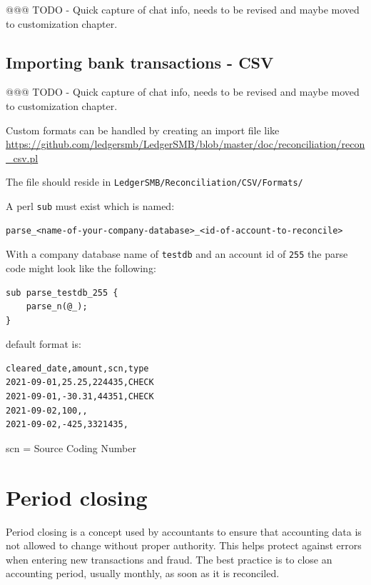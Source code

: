 @@@ TODO - Quick capture of chat info, needs to be revised and maybe moved to customization chapter.

\subsection{Importing bank transactions - CSV}
\label{subsec-importing-bank-transactions-csv}


@@@ TODO - Quick capture of chat info, needs to be revised and maybe moved to customization chapter.

Custom formats can be handled by creating an import file
like \url{https://github.com/ledgersmb/LedgerSMB/blob/master/doc/reconciliation/recon_csv.pl}

The file should reside in \texttt{LedgerSMB/Reconciliation/CSV/Formats/}

A perl \texttt{sub} must exist which is named:

\begin{verbatim}
parse_<name-of-your-company-database>_<id-of-account-to-reconcile>
\end{verbatim}

With a company database name of \texttt{testdb} and an account id of \texttt{255} the parse code might look like the following:

\begin{verbatim}
sub parse_testdb_255 {
    parse_n(@_);
}
\end{verbatim}

default format is:
\begin{verbatim}
cleared_date,amount,scn,type
2021-09-01,25.25,224435,CHECK
2021-09-01,-30.31,44351,CHECK
2021-09-02,100,,
2021-09-02,-425,3321435,
\end{verbatim}

scn = Source Coding Number

\section{Period closing}
\label{sec-business-processes-accounting-period-closing}

Period closing is a concept used by accountants to ensure that accounting data is not allowed to change without proper authority.
This helps protect against errors when entering new transactions and fraud. 
The best practice is to close an accounting period, usually monthly, as soon as it is reconciled.

